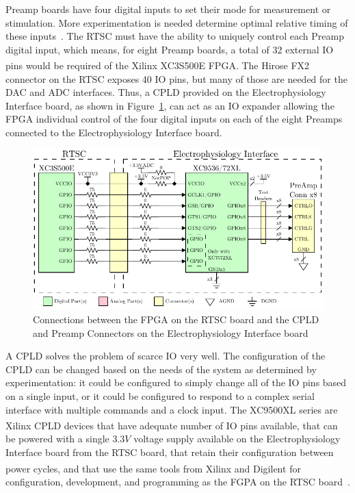 Preamp boards have four digital inputs to set their mode for measurement or stimulation.  More experimentation is needed determine optimal relative timing of these inputs~\cite{StahlMSEE}.  The RTSC must have the ability to uniquely control each Preamp digital input, which means, for eight Preamp boards, a total of 32 external IO pins would be required of the Xilinx\textsuperscript{\textregistered} XC3S500E FPGA.  The Hirose FX2 connector on the RTSC exposes 40 IO pins, but many of those are needed for the DAC and ADC interfaces.  Thus, a CPLD provided on the Electrophysiology Interface board, as shown in Figure~\ref{fig:CPLD}, can act as an IO expander allowing the FPGA individual control of the four digital inputs on each of the eight Preamps connected to the Electrophysiology Interface board.

\begin{figure}[H]
	\centering 
		\includegraphics{./figures/CPLD} 
	\caption{Connections between the FPGA on the RTSC board and the CPLD and Preamp Connectors on the Electrophysiology Interface board\label{fig:CPLD}}
\end{figure}

A CPLD solves the problem of scarce IO very well.  The configuration of the CPLD can be changed based on the needs of the system as determined by experimentation: it could be configured to simply change all of the IO pins based on a single input, or it could be configured to respond to a complex serial interface with multiple commands and a clock input.  The XC9500XL series are Xilinx\textsuperscript{\textregistered} CPLD devices that have adequate number of IO pins available, that can be powered with a single $3.3\unit{V}$ voltage supply available on the Electrophysiology Interface board from the RTSC board, that retain their configuration between power cycles, and that use the same tools from Xilinx\textsuperscript{\textregistered} and Digilent\textsuperscript{\textregistered} for configuration, development, and programming as the FGPA on the RTSC board~\cite{XC9500XLds}.

